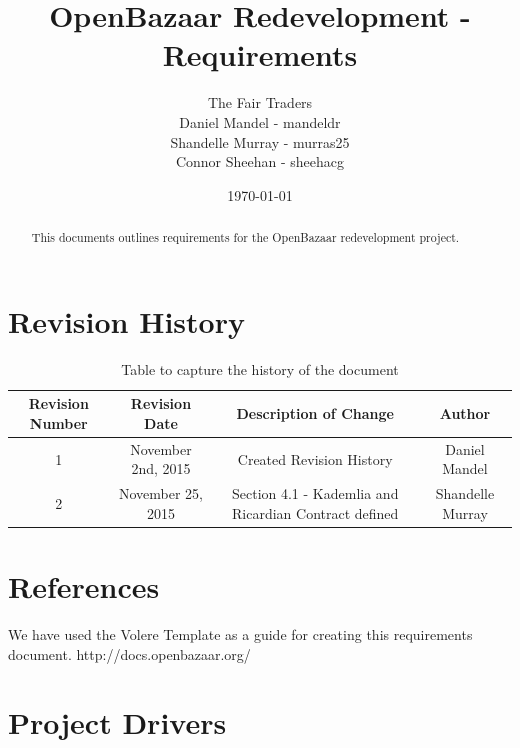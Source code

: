 \documentclass{article}
\begin{document}

\title{OpenBazaar Redevelopment - Requirements}
\author{The Fair Traders \\ Daniel Mandel - mandeldr \\ Shandelle Murray - murras25 \\ Connor Sheehan - sheehacg}
\date{\today}
\maketitle

\begin{abstract}
This documents outlines requirements for the OpenBazaar redevelopment project.
\end{abstract}

\newpage

\tableofcontents

\section*{Revision History}

\begin{table}[h!]
\centering
\begin{tabular}{||c c c c||} 
 \hline
 Revision Number & Revision Date & Description of Change & Author \\ [0.5ex] 
 \hline\hline
 1 & November 2nd, 2015 & Created Revision History & Daniel Mandel \\ [1ex] 
 \hline
 2 & November 25, 2015 & Section 4.1 - Kademlia and Ricardian Contract defined  & Shandelle Murray \\ [1ex]
 \hline
\end{tabular}
\caption{Table to capture the history of the document}
\label{table:1}
\end{table}

\section*{References}
We have used the Volere Template as a guide for creating this requirements document.
http://docs.openbazaar.org/

\section*{Project Drivers}
\end{document}
